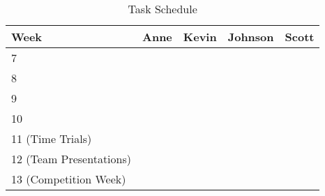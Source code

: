 \documentclass[11pt, oneside]{article} %
\begin{document}
\begin{table}[ht]
	\caption{Task Schedule}
	\centering
	\begin{tabular}{ | p{4.5cm} | p{3cm} | p{3cm} | p{3cm} | p{3cm} |} 
	\hline
	\textbf{Week} & \textbf{Anne} & \textbf{Kevin} & \textbf{Johnson} & \textbf{Scott} \\ \hline 
	7& & & & \\ \hline
	8& & & & \\ \hline
	9& & & & \\ \hline
	10& & & & \\ \hline
	11 (Time Trials)& & & & \\ \hline
	12 (Team Presentations)& & & & \\ \hline
	13 (Competition Week)& & & & \\ \hline
	\end{tabular}
	\label{table:Task Schedule}
\end{table}

\clearpage

\end{document}
